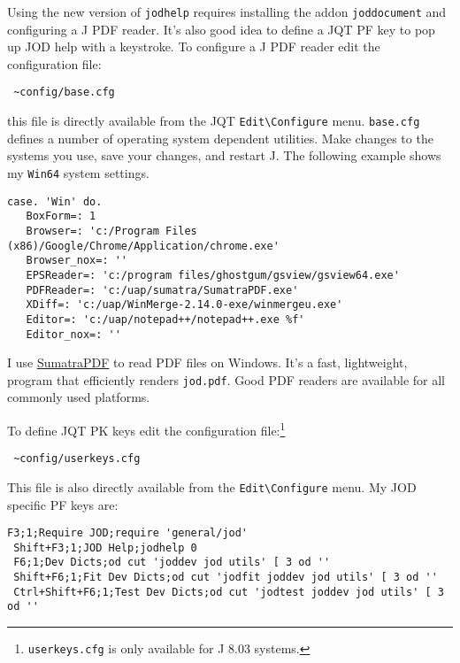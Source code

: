 Using the new version of \texttt{jodhelp} requires installing the addon
\texttt{joddocument} and configuring a J PDF reader. It's also good idea
to define a JQT PF key to pop up JOD help with a keystroke. To configure
a J PDF reader edit the configuration file:

\begin{verbatim}
 ~config/base.cfg
\end{verbatim}

\noindent this file is directly available from the JQT
\texttt{Edit\textbackslash{}Configure} menu. \texttt{base.cfg} defines a
number of operating system dependent utilities. Make changes to the
systems you use, save your changes, and restart J. The following example
shows my \texttt{Win64} system settings.

\begin{lstlisting}[language=jdoc, frame=single,framerule=0pt,label=lst:scr4946X0]
 case. 'Win' do.   
   BoxForm=: 1   
   Browser=: 'c:/Program Files (x86)/Google/Chrome/Application/chrome.exe'   
   Browser_nox=: ''   
   EPSReader=: 'c:/program files/ghostgum/gsview/gsview64.exe'   
   PDFReader=: 'c:/uap/sumatra/SumatraPDF.exe'   
   XDiff=: 'c:/uap/WinMerge-2.14.0-exe/winmergeu.exe'   
   Editor=: 'c:/uap/notepad++/notepad++.exe %f'   
   Editor_nox=: '' 
\end{lstlisting}

I use
\href{http://www.sumatrapdfreader.org/free-pdf-reader.html}{SumatraPDF}
to read PDF files on Windows. It's a fast, lightweight, program that
efficiently renders \texttt{jod.pdf}. Good PDF readers are available for
all commonly used platforms.

To define JQT PK keys edit the configuration
file:\footnote{\texttt{userkeys.cfg} is only available for J 8.03 systems.
}

\begin{verbatim}
 ~config/userkeys.cfg 
\end{verbatim}

\noindent This file is also directly available from the
\texttt{Edit\textbackslash{}Configure} menu. My JOD specific PF keys
are:

\begin{lstlisting}[language=jdoc, frame=single,framerule=0pt,label=lst:scr4946X1]
 F3;1;Require JOD;require 'general/jod' 
 Shift+F3;1;JOD Help;jodhelp 0 
 F6;1;Dev Dicts;od cut 'joddev jod utils' [ 3 od '' 
 Shift+F6;1;Fit Dev Dicts;od cut 'jodfit joddev jod utils' [ 3 od '' 
 Ctrl+Shift+F6;1;Test Dev Dicts;od cut 'jodtest joddev jod utils' [ 3 od '' 
\end{lstlisting}

